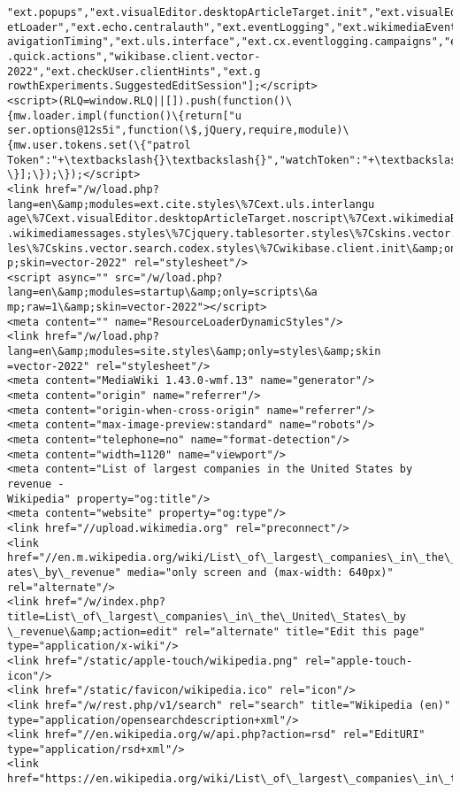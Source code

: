 \documentclass[11pt]{article}
\begin{document}
\begin{Verbatim}[commandchars=\\\{\}]
"ext.popups","ext.visualEditor.desktopArticleTarget.init","ext.visualEditor.targ
etLoader","ext.echo.centralauth","ext.eventLogging","ext.wikimediaEvents","ext.n
avigationTiming","ext.uls.interface","ext.cx.eventlogging.campaigns","ext.cx.uls
.quick.actions","wikibase.client.vector-2022","ext.checkUser.clientHints","ext.g
rowthExperiments.SuggestedEditSession"];</script>
<script>(RLQ=window.RLQ||[]).push(function()\{mw.loader.impl(function()\{return["u
ser.options@12s5i",function(\$,jQuery,require,module)\{mw.user.tokens.set(\{"patrol
Token":"+\textbackslash{}\textbackslash{}","watchToken":"+\textbackslash{}\textbackslash{}","csrfToken":"+\textbackslash{}\textbackslash{}"\});
\}];\});\});</script>
<link href="/w/load.php?lang=en\&amp;modules=ext.cite.styles\%7Cext.uls.interlangu
age\%7Cext.visualEditor.desktopArticleTarget.noscript\%7Cext.wikimediaBadges\%7Cext
.wikimediamessages.styles\%7Cjquery.tablesorter.styles\%7Cskins.vector.icons\%2Csty
les\%7Cskins.vector.search.codex.styles\%7Cwikibase.client.init\&amp;only=styles\&am
p;skin=vector-2022" rel="stylesheet"/>
<script async="" src="/w/load.php?lang=en\&amp;modules=startup\&amp;only=scripts\&a
mp;raw=1\&amp;skin=vector-2022"></script>
<meta content="" name="ResourceLoaderDynamicStyles"/>
<link href="/w/load.php?lang=en\&amp;modules=site.styles\&amp;only=styles\&amp;skin
=vector-2022" rel="stylesheet"/>
<meta content="MediaWiki 1.43.0-wmf.13" name="generator"/>
<meta content="origin" name="referrer"/>
<meta content="origin-when-cross-origin" name="referrer"/>
<meta content="max-image-preview:standard" name="robots"/>
<meta content="telephone=no" name="format-detection"/>
<meta content="width=1120" name="viewport"/>
<meta content="List of largest companies in the United States by revenue -
Wikipedia" property="og:title"/>
<meta content="website" property="og:type"/>
<link href="//upload.wikimedia.org" rel="preconnect"/>
<link href="//en.m.wikipedia.org/wiki/List\_of\_largest\_companies\_in\_the\_United\_St
ates\_by\_revenue" media="only screen and (max-width: 640px)" rel="alternate"/>
<link href="/w/index.php?title=List\_of\_largest\_companies\_in\_the\_United\_States\_by
\_revenue\&amp;action=edit" rel="alternate" title="Edit this page"
type="application/x-wiki"/>
<link href="/static/apple-touch/wikipedia.png" rel="apple-touch-icon"/>
<link href="/static/favicon/wikipedia.ico" rel="icon"/>
<link href="/w/rest.php/v1/search" rel="search" title="Wikipedia (en)"
type="application/opensearchdescription+xml"/>
<link href="//en.wikipedia.org/w/api.php?action=rsd" rel="EditURI"
type="application/rsd+xml"/>
<link href="https://en.wikipedia.org/wiki/List\_of\_largest\_companies\_in\_the\_Unite

\end{Verbatim}
\end{document}
